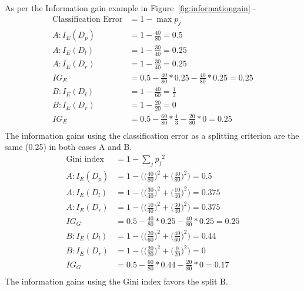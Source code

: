 \documentclass{book}
\begin{document}
As per the Information gain example in Figure~\ref{fig:informationgain} -
\begin{align*}
\mbox{Classification Error} &= 1 - \max p_j \\
A: I_E(D_p) &= 1 - \frac{40}{80} = 0.5\\
A: I_E(D_l)  &= 1 - \frac{30}{40} = 0.25\\
A: I_E(D_r)  &= 1 - \frac{30}{40} = 0.25\\
IG_{E} &= 0.5 - \frac{40}{80} * 0.25 - \frac{40}{80} * 0.25 = 0.25 \\
B: I_E(D_l)  &= 1 - \frac{40}{60} = \frac{1}{3}\\
B: I_E(D_r)  &= 1 - \frac{20}{20} = 0\\
IG_{E} &= 0.5 - \frac{60}{80} * \frac{1}{3} - \frac{20}{80} * 0 = 0.25 \\
\end{align*}
The information gains using the classification error as a splitting criterion are the same (0.25) in both cases A and B.
\begin{align*}
\mbox{Gini index} &= 1 - \sum_j {p_j}^2 \\
A: I_E(D_p) &= 1 - \bigg(\Big(\frac{40}{80}\Big)^2 + \Big(\frac{40}{80}\Big)^2\bigg) = 0.5\\
A: I_E(D_l)  &= 1 - \bigg(\Big(\frac{30}{40}\Big)^2 + \Big(\frac{10}{40}\Big)^2\bigg) = 0.375\\
A: I_E(D_r)  &= 1 - \bigg(\Big(\frac{10}{40}\Big)^2 + \Big(\frac{30}{40}\Big)^2\bigg) = 0.375\\
IG_{G} &= 0.5 - \frac{40}{80} * 0.25 - \frac{40}{80} * 0.25 = 0.25 \\
B: I_E(D_l)  &= 1 - \bigg(\Big(\frac{20}{60}\Big)^2 + \Big(\frac{40}{60}\Big)^2\bigg) = 0.44\\
B: I_E(D_r)  &= 1 - \bigg(\Big(\frac{20}{20}\Big)^2 + \Big(\frac{0}{20}\Big)^2\bigg) = 0\\
IG_{G} &= 0.5 - \frac{60}{80} * 0.44 - \frac{20}{80} * 0 = 0.17 \\
\end{align*}
The information gains using the Gini index favors the split B.
\end{document}
